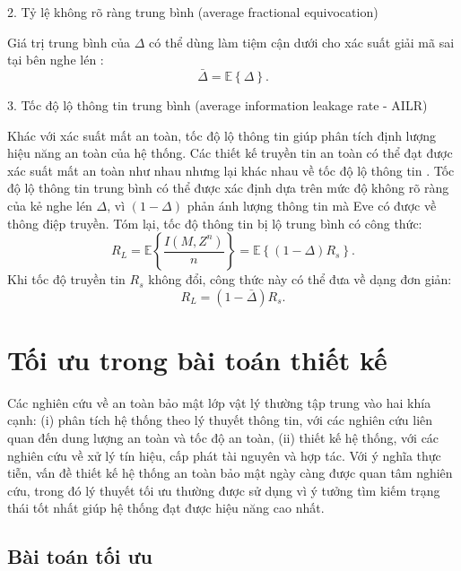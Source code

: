 \documentclass[../main.tex]{subfiles}
\begin{document}
2. Tỷ lệ không rõ ràng trung bình (average fractional equivocation)

Giá trị trung bình của $\Delta$ có thể dùng làm tiệm cận dưới cho xác suất giải mã sai tại bên nghe lén \cite{he2016secrecy}:
\begin{equation}\label{delta-expectation}
    \bar{\Delta} = \mathbb{E}\left\{\Delta\right\}.
\end{equation}

3.  Tốc độ lộ thông tin trung bình (average information leakage rate - AILR)

Khác với xác suất mất an toàn, tốc độ lộ thông tin giúp phân tích định lượng hiệu năng an toàn của hệ thống. Các thiết kế truyền tin an toàn có thể đạt được xác suất mất an toàn như nhau nhưng lại khác nhau về tốc độ lộ thông tin \cite{he2016secrecy}. Tốc độ lộ thông tin trung bình có thể được xác định dựa trên mức độ không rõ ràng của kẻ nghe lén $\Delta$, vì $(1 - \Delta)$ phản ánh lượng thông tin mà Eve có được về thông điệp truyền. Tóm lại, tốc độ thông tin bị lộ trung bình có công thức:
\begin{equation}\label{ailr}
    R_L = \mathbb{E}\left\{\frac{I\left(M, Z^n\right)}{n}\right\} = \mathbb{E}\left\{(1-\Delta)R_s\right\}.
\end{equation}
Khi tốc độ truyền tin $R_s$ không đổi, công thức này có thể đưa về dạng đơn giản:
\begin{equation}\label{ailr-fixed}
    R_L = \left(1-\bar{\Delta}\right)R_s.
\end{equation}

\section{Tối ưu trong bài toán thiết kế}

Các nghiên cứu về an toàn bảo mật lớp vật lý thường tập trung vào hai khía cạnh: (i) phân tích hệ thống theo lý thuyết thông tin, với các nghiên cứu liên quan đến dung lượng an toàn và tốc độ an toàn, (ii) thiết kế hệ thống, với các nghiên cứu về xử lý tín hiệu, cấp phát tài nguyên và hợp tác. Với ý nghĩa thực tiễn, vấn đề thiết kế hệ thống an toàn bảo mật ngày càng được quan tâm nghiên cứu, trong đó lý thuyết tối ưu thường được sử dụng vì ý tưởng tìm kiếm trạng thái tốt nhất giúp hệ thống đạt được hiệu năng cao nhất.

\subsection{Bài toán tối ưu}
\end{document}
